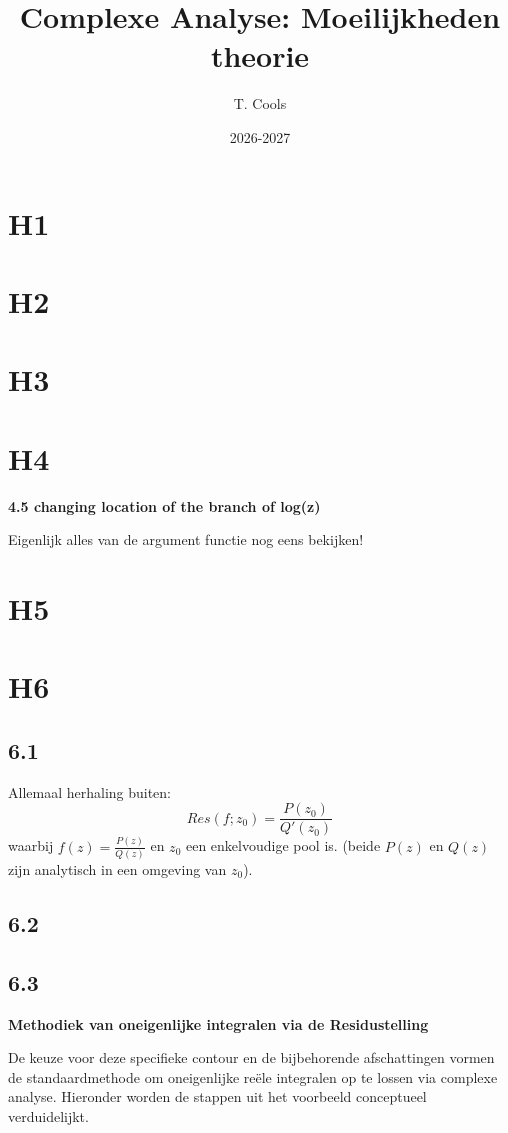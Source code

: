 \documentclass[a4paper,twoside]{article}
\title{Complexe Analyse: Moeilijkheden theorie}
\author{T. Cools}
\date{2026-2027}
\theoremstyle{definition}
\theoremstyle{plain}
\begin{document}
\maketitle

\begin{abstract}

\end{abstract}
\section{H1}
\section{H2}
\section{H3}
\section{H4}
\textbf{4.5 changing location of the branch of log(z)}

Eigenlijk alles van de argument functie nog eens bekijken!

\section{H5}
\section{H6}
\subsection{6.1}
Allemaal herhaling buiten:
\[Res(f;z_0) = \frac{P(z_0)}{Q'(z_0)}\]
waarbij $f(z) = \frac{P(z)}{Q(z)}$ en $z_0$ een enkelvoudige pool is. (beide \(P(z)\) en \(Q(z)\) zijn analytisch in een omgeving van \(z_0\)).
\subsection{6.2}
\subsection{6.3}

\textbf{Methodiek van oneigenlijke integralen via de Residustelling}

De keuze voor deze specifieke contour en de bijbehorende afschattingen vormen de standaardmethode om oneigenlijke reële integralen op te lossen via complexe analyse. Hieronder worden de stappen uit het voorbeeld conceptueel verduidelijkt.
\end{document}
